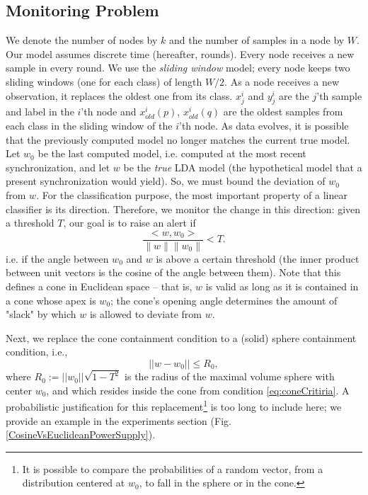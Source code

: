 \subsection{Monitoring Problem}
\label{sub:problem}
We denote the number of nodes by $k$ and the number of samples in a node by $W$.
Our model assumes discrete time (hereafter, rounds). Every node receives a new sample
in every round. We use the \textit{sliding window} model; every node keeps two sliding windows (one for each class) of length $W/2$. As a node receives a new observation, it replaces the oldest one from its class.
$x^i_j$ and $y^i_j$ are the $j$'th sample and label in the $i$'th node
and $x_{old}^i(p)$, $x_{old}^i(q)$ are the oldest samples from each class in
the sliding window of the $i$'th node.
As data evolves, it is possible that the previously computed model
no longer matches the current true model. Let $w_0$ be the last computed model, i.e. computed at the most recent synchronization, and let $w$ be the \textit{true} LDA model (the hypothetical model that a present synchronization would yield). So,
we must bound the deviation of $w_0$ from $w$.
For the classification purpose, the most important property of a linear classifier is its direction. Therefore, we monitor the change in this direction: given a threshold $T$, our goal is to raise an alert if
\begin{equation} \label{eq:coneCritiria}
\frac{<w,w_0>}{\parallel w \parallel \parallel w_0 \parallel}  < T.
\end{equation}
i.e. if the angle between $w_0$ and $w$ is above a certain threshold (the inner product between unit vectors is the cosine of the angle between them). Note that this
defines a cone in Euclidean space -- that is, $w$ is valid as long as it is
contained in a cone whose apex is $w_0$; the cone's opening angle determines
the amount of "slack" by which $w$ is allowed to deviate from $w$.

Next, we replace the cone containment condition to a (solid) sphere containment condition, i.e., 
\begin{equation} \label{eq:critiria}
||w-w_0||   \leq  R_0,
\end{equation}
where $R_0 := ||w_0|| \sqrt{1-T^2}$ is the radius of the maximal volume sphere with center $w_0$, and
which resides inside the cone from condition \ref{eq:coneCritiria}. A probabilistic justification for
this replacement\footnote{It is possible to compare the probabilities of a random vector, from a
distribution centered at $w_0$, to fall in the sphere or in the cone.} is too long to 
include here; we provide an example in the experiments section 
(Fig. \ref{CosineVsEuclideanPowerSupply}).

